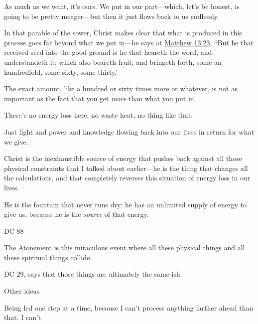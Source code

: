 \begin{compactitem}
\begin{compactitem}
\begin{compactitem}
							\item As much as we want, it's ours. We put in our part---which, let's be honest, is going to be pretty meager---but then it just flows back to us endlessly.
							\item In that parable of the sower, Christ makes clear that what is produced in this process goes far beyond what we put in---he says at \hyperref[MATTHEW-13-23]{Matthew 13:23}, ``But he that received seed into the good ground is he that heareth the word, and understandeth it; which also beareth fruit, and bringeth forth, some an hundredfold, some sixty, some thirty.'
							\item The exact amount, like a hundred or sixty times more or whatever, is not as important as the fact that you get \textit{more} than what you put in. 
							\item There's no energy loss here, no waste heat, no thing like that.
							\item Just light and power and knowledge flowing back into our lives in return for what we give.
						\end{compactitem}
				\end{compactitem}
				
			\item Christ is the inexhaustible source of energy that pushes back against all those physical constraints that I talked about earlier---he is the thing that changes all the calculations, and that completely reverses this situation of energy loss in our lives.
				\begin{compactitem}
					\item He is the fountain that never runs dry; he has an unlimited supply of energy to give us, because he is the \textit{source} of that energy.
					\item DC 88
					\item The Atonement is this miraculous event where all these physical things and all these spiritual things collide.
					\item DC 29, says that those things are ultimately the same-ish
				\end{compactitem}
				
			\item Other ideas
				\begin{compactitem}
					\item Being led one step at a time, because I can't process anything farther ahead than that. I can't 
				\end{compactitem}
		
		\end{compactitem}
	
